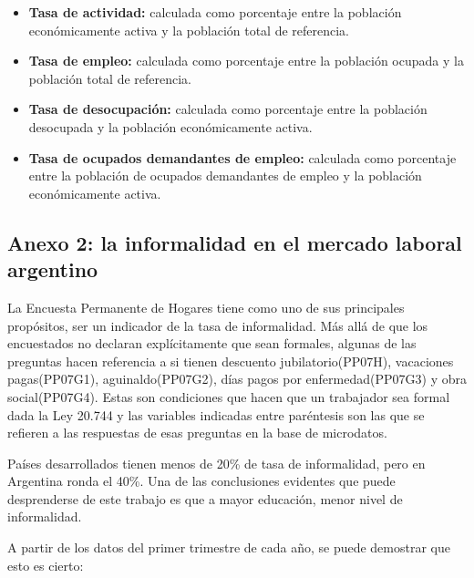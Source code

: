 \documentclass[a4paper]{article}
\theoremstyle{plain}
\theoremstyle{definition}
\begin{document}
 \begin{itemize}
 \item  \textbf{Tasa de actividad:} calculada como porcentaje entre la población económicamente activa y la población total de referencia.
\item  \textbf{Tasa de empleo:} calculada como porcentaje entre la población ocupada y la población total de referencia.
\item \textbf{Tasa de desocupación:} calculada como porcentaje entre la población desocupada y la población económicamente activa.
\item \textbf{Tasa de ocupados demandantes de empleo:} calculada como porcentaje entre la población de ocupados demandantes de empleo y la población económicamente activa.
 \end{itemize}


\subsection{Anexo 2: la informalidad en el mercado laboral argentino}

La Encuesta Permanente de Hogares tiene como uno de sus principales propósitos, ser un indicador de la tasa de informalidad. Más allá de que los encuestados no declaran explícitamente que sean formales, algunas de las preguntas hacen referencia a si tienen descuento jubilatorio(PP07H), vacaciones pagas(PP07G1),  aguinaldo(PP07G2), días pagos por enfermedad(PP07G3) y obra social(PP07G4). Estas son condiciones que hacen que un trabajador sea formal dada la Ley 20.744 y las variables indicadas entre paréntesis son las que se refieren a las respuestas de esas preguntas en la base de microdatos. 

Países desarrollados tienen menos de 20\% de tasa de informalidad, pero en Argentina ronda el 40\%. Una de las conclusiones evidentes que puede desprenderse de este trabajo es que a mayor educación, menor nivel de informalidad. 

A partir de los datos del primer trimestre de cada año, se puede demostrar que esto es cierto:
\end{document}
